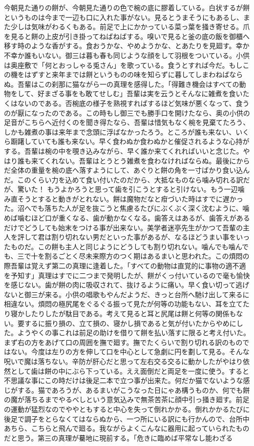 \documentclass[12pt, openright]{book}
\begin{document}
今朝見た通りの餅が、今朝見た通りの色で椀の底に膠着している。白状するが餅というものは今まで一辺も口に入れた事がない。見るとうまそうにもあるし、また少しは気味がわるくもある。前足で上にかかっている菜っ葉を掻き寄せる。爪を見ると餅の上皮が引き掛ってねばねばする。嗅いで見ると釜の底の飯を御櫃へ移す時のような香がする。食おうかな、やめようかな、とあたりを見廻す。幸か不幸か誰もいない。御三は暮も春も同じような顔をして羽根をついている。小供は奥座敷で「何とおっしゃる兎さん」を歌っている。食うとすれば今だ。もしこの機をはずすと来年までは餅というものの味を知らずに暮してしまわねばならぬ。吾輩はこの刹那に猫ながら一の真理を感得した。「得難き機会はすべての動物をして、好まざる事をも敢てせしむ」吾輩は実を云うとそんなに雑煮を食いたくはないのである。否椀底の様子を熟視すればするほど気味が悪くなって、食うのが厭になったのである。この時もし御三でも勝手口を開けたなら、奥の小供の足音がこちらへ近付くのを聞き得たなら、吾輩は惜気もなく椀を見棄てたろう、しかも雑煮の事は来年まで念頭に浮ばなかったろう。ところが誰も来ない、いくら蹰躇していても誰も来ない。早く食わぬか食わぬかと催促されるような心持がする。吾輩は椀の中を覗き込みながら、早く誰か来てくれればいいと念じた。やはり誰も来てくれない。吾輩はとうとう雑煮を食わなければならぬ。最後にからだ全体の重量を椀の底へ落すようにして、あぐりと餅の角を一寸ばかり食い込んだ。このくらい力を込めて食い付いたのだから、大抵なものなら噛み切れる訳だが、驚いた！ もうよかろうと思って歯を引こうとすると引けない。もう一辺噛み直そうとすると動きがとれない。餅は魔物だなと疳づいた時はすでに遅かった。沼へでも落ちた人が足を抜こうと焦慮るたびにぶくぶく深く沈むように、噛めば噛むほど口が重くなる、歯が動かなくなる。歯答えはあるが、歯答えがあるだけでどうしても始末をつける事が出来ない。美学者迷亭先生がかつて吾輩の主人を評して君は割り切れない男だといった事があるが、なるほどうまい事をいったものだ。この餅も主人と同じようにどうしても割り切れない。噛んでも噛んでも、三で十を割るごとく尽未来際方のつく期はあるまいと思われた。この煩悶の際吾輩は覚えず第二の真理に逢着した。「すべての動物は直覚的に事物の適不適を予知す」真理はすでに二つまで発明したが、餅がくっ付いているので毫も愉快を感じない。歯が餅の肉に吸収されて、抜けるように痛い。早く食い切って逃げないと御三が来る。小供の唱歌もやんだようだ、きっと台所へ馳け出して来るに相違ない。煩悶の極尻尾をぐるぐる振って見たが何等の功能もない、耳を立てたり寝かしたりしたが駄目である。考えて見ると耳と尻尾は餅と何等の関係もない。要するに振り損の、立て損の、寝かし損であると気が付いたからやめにした。ようやくの事これは前足の助けを借りて餅を払い落すに限ると考え付いた。まず右の方をあげて口の周囲を撫で廻す。撫でたくらいで割り切れる訳のものではない。今度は左りの方を伸して口を中心として急劇に円を劃して見る。そんな呪いで魔は落ちない。辛防が肝心だと思って左右交る交るに動かしたがやはり依然として歯は餅の中にぶら下っている。ええ面倒だと両足を一度に使う。すると不思議な事にこの時だけは後足二本で立つ事が出来た。何だか猫でないような感じがする。猫であろうが、あるまいがこうなった日にゃあ構うものか、何でも餅の魔が落ちるまでやるべしという意気込みで無茶苦茶に顔中引っ掻き廻す。前足の運動が猛烈なのでややともすると中心を失って倒れかかる。倒れかかるたびに後足で調子をとらなくてはならぬから、一つ所にいる訳にも行かんので、台所中あちら、こちらと飛んで廻る。我ながらよくこんなに器用に起っていられたものだと思う。第三の真理が驀地に現前する。「危きに臨めば平常なし能わざる
\end{document}
